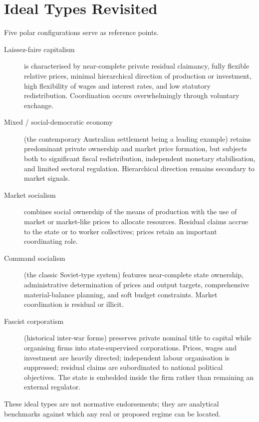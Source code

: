 \documentclass[12pt,anyside]{book}
\theoremstyle{definition}
\theoremstyle{plain}
\theoremstyle{remark}
\begin{document}
\section{Ideal Types Revisited}

Five polar configurations serve as reference points.

\begin{description}
\item[Laissez-faire capitalism] is characterised by near-complete private residual claimancy, fully flexible relative prices, minimal hierarchical direction of production or investment, high flexibility of wages and interest rates, and low statutory redistribution. Coordination occurs overwhelmingly through voluntary exchange.

\item[Mixed / social-democratic economy] (the contemporary Australian settlement being a leading example) retains predominant private ownership and market price formation, but subjects both to significant fiscal redistribution, independent monetary stabilisation, and limited sectoral regulation. Hierarchical direction remains secondary to market signals.

\item[Market socialism] combines social ownership of the means of production with the use of market or market-like prices to allocate resources. Residual claims accrue to the state or to worker collectives; prices retain an important coordinating role.

\item[Command socialism] (the classic Soviet-type system) features near-complete state ownership, administrative determination of prices and output targets, comprehensive material-balance planning, and soft budget constraints. Market coordination is residual or illicit.

\item[Fascist corporatism] (historical inter-war forms) preserves private nominal title to capital while organising firms into state-supervised corporations. Prices, wages and investment are heavily directed; independent labour organisation is suppressed; residual claims are subordinated to national political objectives. The state is embedded inside the firm rather than remaining an external regulator.
\end{description}

These ideal types are not normative endorsements; they are analytical benchmarks against which any real or proposed regime can be located.
\end{document}

